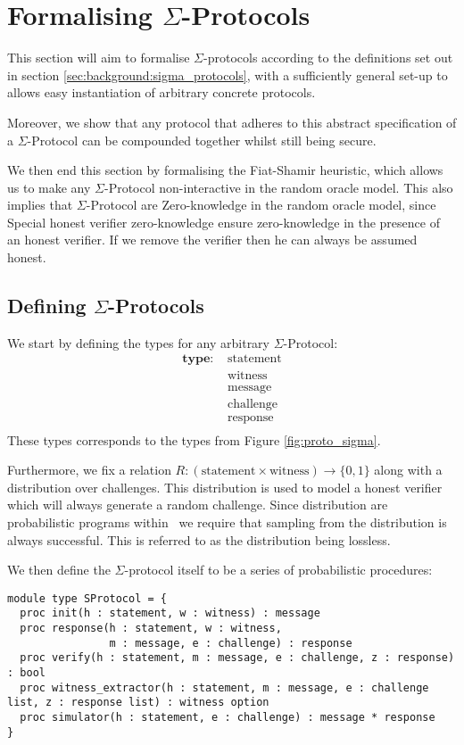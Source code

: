 \chapter{Formalising $\Sigma$-Protocols}
\label{ch:formal_sigma}
This section will aim to formalise $\Sigma$-protocols according to the
definitions set out in section \ref{sec:background:sigma_protocols}, with a
sufficiently general set-up to allows easy instantiation of arbitrary concrete
protocols.

Moreover, we show that any protocol that adheres to this abstract specification
of a $\Sigma$-Protocol can be compounded together whilst still being secure.

We then end this section by formalising the Fiat-Shamir heuristic, which allows
us to make any $\Sigma$-Protocol non-interactive in the random oracle model.
This also implies that $\Sigma$-Protocol are Zero-knowledge in the random oracle
model, since Special honest verifier zero-knowledge ensure zero-knowledge in the
presence of an honest verifier. If we remove the verifier then he can always be
assumed honest.

\section{Defining $\Sigma$-Protocols}
\label{sec:sigma:def}
We start by defining the types for any arbitrary $\Sigma$-Protocol:
\begin{align*}
  \textbf{type: } &\text{statement} \\
                  &\text{witness} \\
                  &\text{message} \\
                  &\text{challenge} \\
                  &\text{response} \\
\end{align*}
These types corresponds to the types from Figure \ref{fig:proto_sigma}.

Furthermore, we fix a relation
$R : (\text{statement} \times \text{witness}) \rightarrow \{0,1\}$ along with
a distribution over challenges. This distribution is used to model a honest
verifier which will always generate a random challenge. Since distribution are
probabilistic programs within \easycrypt\ we require that sampling from the
distribution is always successful. This is referred to as the distribution being lossless.

We then define the $\Sigma$-protocol itself to be a series of probabilistic procedures:
\begin{lstlisting}[label=lst:sigma_procedures,caption= Abstract procedures of $\Sigma$-Protocols]
module type SProtocol = {
  proc init(h : statement, w : witness) : message
  proc response(h : statement, w : witness,
                m : message, e : challenge) : response
  proc verify(h : statement, m : message, e : challenge, z : response) : bool
  proc witness_extractor(h : statement, m : message, e : challenge list, z : response list) : witness option
  proc simulator(h : statement, e : challenge) : message * response
}
\end{lstlisting}

